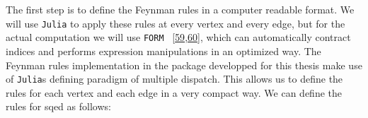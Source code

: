 \documentclass[
  11pt,
  a4paper,
  DIV=11,
  numbers=noendperiod,
  twoside]{scrreprt}
\newenvironment{Shaded}{\begin{snugshade}}{\end{snugshade}}
\newcommand{\DataTypeTok}[1]{\textcolor[rgb]{0.68,0.00,0.00}{#1}}
\newcommand{\FunctionTok}[1]{\textcolor[rgb]{0.28,0.35,0.67}{#1}}
\newcommand{\KeywordTok}[1]{\textcolor[rgb]{0.00,0.23,0.31}{#1}}
\newcommand{\NormalTok}[1]{\textcolor[rgb]{0.00,0.23,0.31}{#1}}
\newcommand{\OperatorTok}[1]{\textcolor[rgb]{0.37,0.37,0.37}{#1}}
\newcommand{\PreprocessorTok}[1]{\textcolor[rgb]{0.68,0.00,0.00}{#1}}
\newcommand{\SpecialCharTok}[1]{\textcolor[rgb]{0.37,0.37,0.37}{#1}}
\newcommand{\StringTok}[1]{\textcolor[rgb]{0.13,0.47,0.30}{#1}}
\DeclareRobustCommand{\[}{\begin{equation}}
\DeclareRobustCommand{\]}{\end{equation}}
\begin{document}
The first step is to define the Feynman rules in a computer readable
format. We will use \texttt{Julia} to apply these rules at every vertex
and every edge, but for the actual computation we will use \texttt{FORM}
~{[}\protect\hyperlink{ref-Vermaseren:2000nd}{59},\protect\hyperlink{ref-Kuipers:2012rf}{60}{]},
which can automatically contract indices and performs expression
manipulations in an optimized way. The Feynman rules implementation in
the package developped for this thesis make use of \texttt{Julia}s
defining paradigm of multiple dispatch. This allows us to define the
rules for each vertex and each edge in a very compact way. We can define
the rules for \gls{sqed} as follows:

\begin{Shaded}
\end{Shaded}
\end{document}
